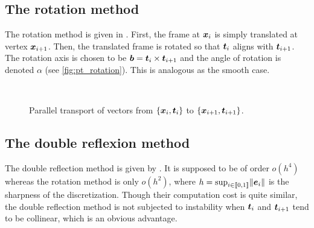 \subsection{The rotation method}

The rotation method is given in \cite{Bloomenthal1990}. First, the frame at $\boldsymbol{x}_i$ is simply translated at vertex $\boldsymbol{x}_{i+1}$. Then, the translated frame is rotated so that $\boldsymbol{t}_i$ aligns with $\boldsymbol{t}_{i+1}$. The rotation axis is chosen to be $\boldsymbol{b} = \boldsymbol{t}_i \times \boldsymbol{t}_{i+1}$ and the angle of rotation is denoted $\alpha$ (see \cref{fig:pt_rotation}). This is analogous as the smooth case.

\begin{figure}[!p]
	\captionsetup[subfloat]{captionskip=10pt}
	\centering
	\\
	\vspace{10pt}
	\caption{Parallel transport of vectors from $\{\boldsymbol{x}_i,\boldsymbol{t}_i\}$ to $\{\boldsymbol{x}_{i+1},\boldsymbol{t}_{i+1}\}$.}
	\label{fig:pt}
\end{figure}

%	

\subsection{The double reflexion method}

The double reflection method is given by \cite{Wang2008}. It is supposed to be of order $o(h^4)$ whereas the rotation method is only $o(h^2)$, where $h = \sup_{i\in \llbracket 0,1 \rrbracket} \lVert\boldsymbol{e}_i\rVert$ is the sharpness of the discretization. Though their computation cost is quite similar, the double reflection method is not subjected to instability when $\boldsymbol{t}_i$ and $\boldsymbol{t}_{i+1}$ tend to be collinear, which is an obvious advantage.

